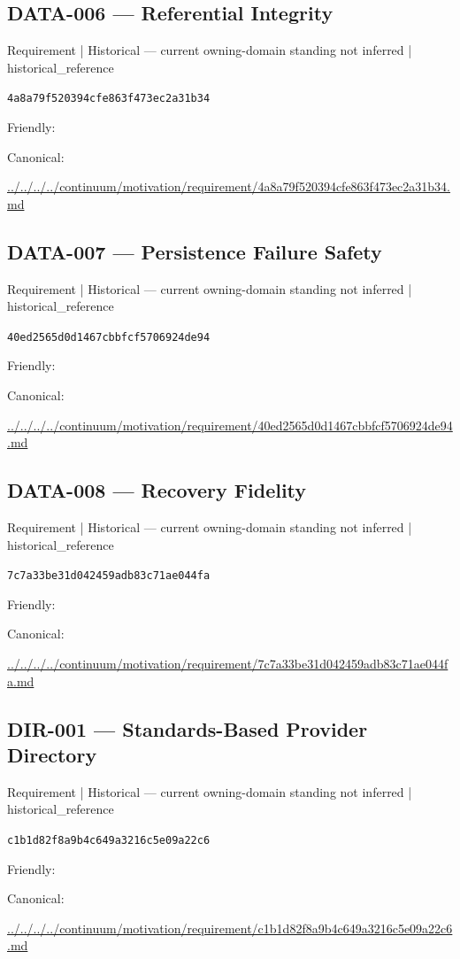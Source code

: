 \documentclass[10pt,a4paper]{article}
\begin{document}
\subsection*{DATA-006 — Referential Integrity}
{\small Requirement | Historical — current owning-domain standing not inferred | historical\_reference}\par
\texttt{4a8a79f520394cfe863f473ec2a31b34}\par
Friendly: \par
Canonical: \par
{\footnotesize\url{../../../../continuum/motivation/requirement/4a8a79f520394cfe863f473ec2a31b34.md}}\par
\subsection*{DATA-007 — Persistence Failure Safety}
{\small Requirement | Historical — current owning-domain standing not inferred | historical\_reference}\par
\texttt{40ed2565d0d1467cbbfcf5706924de94}\par
Friendly: \par
Canonical: \par
{\footnotesize\url{../../../../continuum/motivation/requirement/40ed2565d0d1467cbbfcf5706924de94.md}}\par
\subsection*{DATA-008 — Recovery Fidelity}
{\small Requirement | Historical — current owning-domain standing not inferred | historical\_reference}\par
\texttt{7c7a33be31d042459adb83c71ae044fa}\par
Friendly: \par
Canonical: \par
{\footnotesize\url{../../../../continuum/motivation/requirement/7c7a33be31d042459adb83c71ae044fa.md}}\par
\subsection*{DIR-001 — Standards-Based Provider Directory}
{\small Requirement | Historical — current owning-domain standing not inferred | historical\_reference}\par
\texttt{c1b1d82f8a9b4c649a3216c5e09a22c6}\par
Friendly: \par
Canonical: \par
{\footnotesize\url{../../../../continuum/motivation/requirement/c1b1d82f8a9b4c649a3216c5e09a22c6.md}}\par
\end{document}

